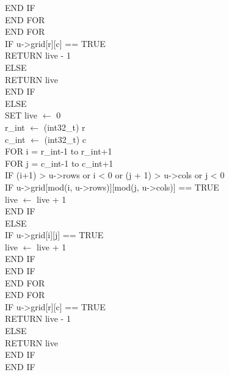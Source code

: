 \documentclass[12pt]{article}
\begin{document}
\indent \indent \indent \indent END IF \\
\indent \indent \indent END FOR \\
\indent \indent END FOR \\
\indent \indent IF u->grid[r][c] == TRUE \\
\indent \indent \indent RETURN live - 1 \\
\indent \indent ELSE \\
\indent \indent \indent RETURN live \\
\indent \indent END IF \\
\indent ELSE \\
\indent \indent SET live $\leftarrow$ 0 \\
\indent r\_int $\leftarrow$ (int32\_t) r \\
\indent c\_int $\leftarrow$ (int32\_t) c \\
\indent \indent FOR i = r\_int-1 to r\_int+1 \\
\indent \indent \indent FOR j = c\_int-1 to c\_int+1 \\
\indent \indent \indent \indent IF (i+1) > u->rows or i < 0 or (j + 1) > u->cols or j < 0 \\
\indent \indent \indent \indent \indent IF u->grid[mod(i, u->rows)][mod(j, u->cols)] == TRUE \\
\indent \indent \indent \indent \indent \indent live $\leftarrow$ live + 1 \\
\indent \indent \indent \indent \indent END IF \\
\indent \indent \indent \indent ELSE \\
\indent \indent \indent \indent \indent IF u->grid[i][j] == TRUE \\
\indent \indent \indent \indent \indent \indent live $\leftarrow$ live + 1 \\
\indent \indent \indent \indent \indent END IF \\
\indent \indent \indent \indent END IF \\
\indent \indent \indent END FOR \\
\indent \indent END FOR \\
\indent \indent IF u->grid[r][c] == TRUE \\
\indent \indent \indent RETURN live - 1 \\
\indent \indent ELSE \\
\indent \indent \indent RETURN live \\
\indent \indent END IF \\
\indent END IF \\
\end{document}
